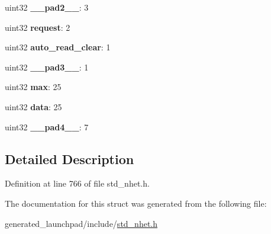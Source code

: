 \begin{DoxyCompactItemize}
\item 
\mbox{\label{structCNT__format_a3edf674d7dcc8f29d299189d45399222}} 
uint32 {\bfseries \+\_\+\+\_\+pad2\+\_\+\+\_\+}\+: 3
\item 
\mbox{\label{structCNT__format_ab8625613f9849c615f5d2a09da735e37}} 
uint32 {\bfseries request}\+: 2
\item 
\mbox{\label{structCNT__format_af86d74c0bc5c157f5b1fdbb9ec881e16}} 
uint32 {\bfseries auto\+\_\+read\+\_\+clear}\+: 1
\item 
\mbox{\label{structCNT__format_a4d092b7cb1812dd98c3e81c3f19715b4}} 
uint32 {\bfseries \+\_\+\+\_\+pad3\+\_\+\+\_\+}\+: 1
\item 
\mbox{\label{structCNT__format_a9b1f26266c22423ed9861c02424c2ac4}} 
uint32 {\bfseries max}\+: 25
\item 
\mbox{\label{structCNT__format_ad70d709ed338c19e060ce8556b127153}} 
uint32 {\bfseries data}\+: 25
\item 
\mbox{\label{structCNT__format_ad60530556b3ad6582e3803d24f540168}} 
uint32 {\bfseries \+\_\+\+\_\+pad4\+\_\+\+\_\+}\+: 7
\end{DoxyCompactItemize}


\subsection{Detailed Description}


Definition at line 766 of file std\+\_\+nhet.\+h.



The documentation for this struct was generated from the following file\+:\begin{DoxyCompactItemize}
\item 
generated\+\_\+launchpad/include/\mbox{\hyperlink{std__nhet_8h}{std\+\_\+nhet.\+h}}\end{DoxyCompactItemize}
